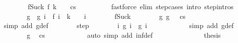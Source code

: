 \begin{isabellebody}
\ \ \ \ \ \ \ \ f{\isacharunderscore}Suc{\isacharunderscore}k{\isacharcolon}\ {\isachardoublequoteopen}f\ {\isacharparenleft}k\ {\isacharplus}\ {}{\isacharparenright}\ {\isacharequal}\ {\isacharparenleft}cs{\isacharprime}{\isacharparenright}{\isachardoublequoteclose}\isanewline
\ \ \ \ \ \ \ \ \isamarkupfalse%
\ {\isacharparenleft}fastforce\ elim{\isacharcolon}\ step{\isachardot}cases\ intro{\isacharcolon}\ step{\isachardot}intros{\isacharparenright}\isanewline
\ \ \ \ \ \ \isamarkupfalse%
\ g\ \ {\isachardoublequoteopen}g\ i\ {\isacharequal}\ f\ {\isacharparenleft}i\ {\isacharplus}\ {\isacharparenleft}k\ {\isacharplus}\ {}{\isacharparenright}{\isacharparenright}{\isachardoublequoteclose}\ \ i\isanewline
\ \ \ \ \ \ \isamarkupfalse%
\ f{\isacharunderscore}Suc{\isacharunderscore}k\isanewline
\ \ \ \ \ \ \isamarkupfalse%
\ g{\isacharunderscore}{}{\isacharcolon}\ {\isachardoublequoteopen}g\ {}\ {\isacharequal}\ {\isacharparenleft}cs{\isacharprime}{\isacharparenright}{\isachardoublequoteclose}\isanewline
\ \ \ \ \ \ \ \ \isamarkupfalse%
\ {\isacharparenleft}simp\ add{\isacharcolon}\ g{\isacharunderscore}def{\isacharparenright}\isanewline
\ \ \ \ \ \ \isamarkupfalse%
\ step\isanewline
\ \ \ \ \ \ \isamarkupfalse%
\ {\isachardoublequoteopen}{\isasymforall}i{\isachardot}\ {\isasymGamma}{\isasymturnstile}g\ i\ {\isasymrightarrow}\ g\ {\isacharparenleft}i\ {\isacharplus}\ {}{\isacharparenright}{\isachardoublequoteclose}\isanewline
\ \ \ \ \ \ \ \ \isamarkupfalse%
\ {\isacharparenleft}simp\ add{\isacharcolon}\ g{\isacharunderscore}def{\isacharparenright}\isanewline
\ \ \ \ \ \ \isamarkupfalse%
\ g{\isacharunderscore}{}\ \isamarkupfalse%
\ {\isachardoublequoteopen}{\isasymGamma}{\isasymturnstile}{\isacharparenleft}cs{\isacharprime}{\isacharparenright}\ {\isasymrightarrow}\ {\isasymdots}{\isacharparenleft}{\isasyminfinity}{\isacharparenright}{\isachardoublequoteclose}\isanewline
\ \ \ \ \ \ \ \ \isamarkupfalse%
\ {\isacharparenleft}auto\ simp\ add{\isacharcolon}\ inf{\isacharunderscore}def{\isacharparenright}\isanewline
\ \ \ \ \ \ \isamarkupfalse%
\isanewline
\ \ \ \ \ \ \isamarkupfalse%
\ {\isacharquery}thesis\isanewline
\ \ \ \ \ \ \ \ \isamarkupfalse%

\end{isabellebody}
